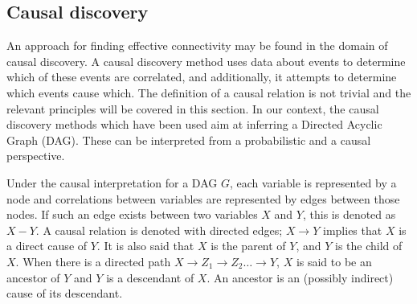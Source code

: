 \documentclass[a4paper, 10pt, english, onecolumn]{article}
\begin{document}
%


\subsection{Causal discovery}
An approach for finding effective connectivity may be found in the domain of causal discovery.
A causal discovery method uses data about events to determine which of these events are correlated, and additionally, it attempts to determine which events cause which.
The definition of a causal relation is not trivial \cite[p.20]{spirtes2000} and the relevant principles will be covered in this section.
In our context, the causal discovery methods which have been used aim at inferring a Directed Acyclic Graph (DAG).
These can be interpreted from a probabilistic and a causal perspective.

Under the causal interpretation for a DAG $G$, each variable is represented by a node and correlations between variables are represented by edges between those nodes.
If such an edge exists between two variables $X$ and $Y$, this is denoted as $X - Y$.
A causal relation is denoted with directed edges; $X \rightarrow Y$ implies that $X$ is a direct cause of $Y$.
It is also said that $X$ is the parent of $Y$, and $Y$ is the child of $X$. 
When there is a directed path $X \rightarrow Z_1 \rightarrow Z_2 \dots \rightarrow Y$, $X$ is said to be an ancestor of $Y$ and $Y$ is a descendant of $X$.
An ancestor is an (possibly indirect) cause of its descendant.
\end{document}
